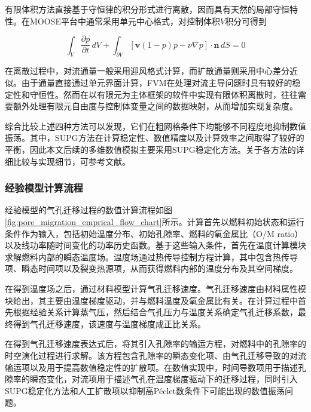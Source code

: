 有限体积方法直接基于守恒律的积分形式进行离散，因而具有天然的局部守恒特性\cite{moukalledFiniteVolumeMethod2016}。在MOOSE平台中通常采用单元中心格式，对控制体积$V$积分可得到

\begin{equation}
	\int_V
	\frac{\partial p}{\partial t}
	\,dV
	+
	\int_{\partial V}
	\left[
	\mathbf v(1-p)p-\nu\nabla p
	\right]\cdot\mathbf n
	\,dS
	=0 
	\label{eq:fvm_weak}
\end{equation}

在离散过程中，对流通量一般采用迎风格式计算，而扩散通量则采用中心差分近似。由于通量直接通过单元界面计算，FVM在处理对流主导问题时具有较好的稳定性和守恒性。然而在以有限元为主体框架的软件中实现有限体积离散时，往往需要额外处理有限元自由度与控制体变量之间的数据映射，从而增加实现复杂度。

综合比较上述四种方法可以发现，它们在粗网格条件下均能够不同程度地抑制数值振荡。其中，SUPG方法在计算稳定性、数值精度以及计算效率之间取得了较好的平衡，因此本文后续的多维数值模拟主要采用SUPG稳定化方法。关于各方法的详细比较与实现细节，可参考文献\cite{WangZhaoHaoYangHuaWuRanLiaoZhongQiKongQianYiDeDuoFangFaDuoWuLiChangMoNiYanJiu2025}。

\subsubsection{经验模型计算流程}
经验模型的气孔迁移过程的数值计算流程如图\ref{fig:pore_migration_emprical_flow_chart}所示。计算首先以燃料初始状态和运行条件作为输入，包括初始温度分布、初始孔隙率、燃料的氧金属比（O/M ratio）以及线功率随时间变化的功率历史函数。基于这些输入条件，首先在温度计算模块求解燃料内部的瞬态温度场。温度场通过热传导控制方程计算，其中包含热传导项、瞬态时间项以及裂变热源项，从而获得燃料内部的温度分布及其空间梯度。

在得到温度场之后，通过材料模型计算气孔迁移速度。气孔迁移速度由材料属性模块给出，其主要由温度梯度驱动，并与燃料温度及氧金属比有关。在计算过程中首先根据经验关系计算蒸气压，然后结合气孔压力与温度关系确定气孔迁移系数，最终得到气孔迁移速度，该速度与温度梯度成正比关系。

在得到气孔迁移速度表达式后，将其引入孔隙率的输运方程，对燃料中的孔隙率的时空演化过程进行求解。该方程包含孔隙率的瞬态变化项、由气孔迁移导致的对流输运项以及用于提高数值稳定性的扩散项。在数值实现中，时间导数项用于描述孔隙率的瞬态变化，对流项用于描述气孔在温度梯度驱动下的迁移过程，同时引入SUPG稳定化方法和人工扩散项以抑制高Péclet数条件下可能出现的数值振荡问题。

